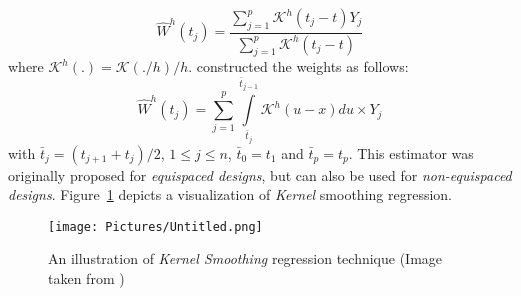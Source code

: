 \begin{equation}
\hat{W}^{h}(t_{j})=\frac{\sum\limits_{j=1}^{p}\mathcal{K}^{h}(t_{j}-t)Y_{j}}{\sum\limits_{j=1}^{p}\mathcal{K}^{h}(t_{j}-t)}
\end{equation}
where $\mathcal{K}^{h}(.)=\mathcal{K}(./h)/h$. \cite{Gasser1979,GassMull1984} constructed the weights as follows:
\begin{equation}
\hat{W}^{h}(t_{j})=\sum\limits_{j=1}^{p}\int\limits_{\bar{t}_{j}}^{\bar{t}_{j-1}}\mathcal{K}^{h}(u-x)du \times Y_{j}
\end{equation}
with $\bar{t}_{j}=(t_{j+1}+t_{j})/2$, $1 \leq j \leq n$, $\bar{t}_{0} = t_{1}$ and $\bar{t}_{p} = t_{p}$. This estimator was originally proposed for \textit{equispaced designs}, but can also be used for \textit{non-equispaced designs}. Figure~\ref{fig:FDA5} depicts a visualization of \textit{Kernel} smoothing regression.
\begin{figure}[h]
  \centering
    \texttt{[image: Pictures/Untitled.png]}
  \caption[\textit{Kernel Smoothing} regression at Boundaries]{An illustration of \textit{Kernel Smoothing} regression technique (Image taken from \citealp{hastie_09_elements-of.statistical-learning})}
  \label{fig:FDA5}
\end{figure}

